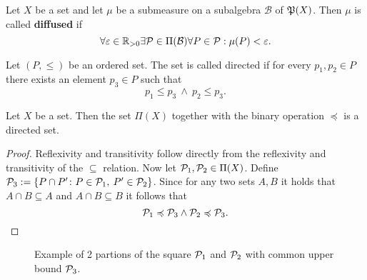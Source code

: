 \begin{defin}
  Let $X$ be a set and let $\mu$ be a submeasure on a subalgebra $\mathcal{B}$ of $\PowS(X)$. Then $\mu$ is called \textbf{diffused} if
  \begin{equation*}
    \forall \varepsilon\in \R_{>0}\exists \P \in \Pi(\mathcal{B})\forall P \in \P: \mu(P) < \varepsilon.
  \end{equation*}
\end{defin}

\begin{defin}
  Let $(P, \leq)$ be an ordered set. The set is called directed if for every $p_1, p_2 \in P$ there exists an element $p_3 \in P$ such that
  \begin{equation*}
    p_1 \leq p_3 \: \land \: p_2 \leq p_3.
  \end{equation*}
\end{defin}

\begin{thm}\label{thm:algdirected}
  Let $X$ be a set. Then the set $\Pi(X)$ together with the binary operation $\preccurlyeq$ is a directed set.
\end{thm}

\begin{proof}
  Reflexivity and transitivity follow directly from the reflexivity and transitivity of the $\subseteq$ relation.
  Now let $\P_1, \P_2 \in \Pi(X)$. Define $\P_3 := \{ P \cap P' \colon P \in \P_1, \:P' \in \P_2 \}$.
  Since for any two sets $A, B$ it holds that $A \cap B \subseteq A$ and $A \cap B \subseteq B$ it follows that
  \begin{equation*}
    \P_1 \preccurlyeq \P_3 \land \P_2 \preccurlyeq \P_3.
  \end{equation*}
\end{proof}

\begin{figure}[ht!]
  \centering
  \caption{Example of 2 partions of the square $\P_1$ and $\P_2$ with common upper bound $\P_3$.}
\end{figure}

